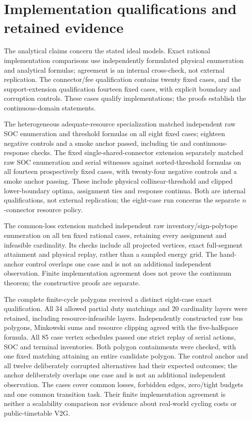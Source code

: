 \section{Implementation qualifications and retained evidence}
\label{app:evidence}
The analytical claims concern the stated ideal models. Exact rational
implementation comparisons use independently formulated physical enumeration
and analytical formulas; agreement is an internal cross-check, not external
replication. The connector/fee qualification contains twenty fixed cases,
and the support-extension qualification fourteen fixed cases, with explicit
boundary and corruption controls. These cases qualify implementations;
the proofs establish the continuous-domain statements.

The heterogeneous adequate-resource specialization matched independent raw
SOC enumeration and threshold formulas on all eight fixed cases; eighteen
negative controls and a smoke anchor passed, including tie and continuous-
response checks. The fixed single-shared-connector extension separately
matched raw SOC enumeration and serial witnesses against sorted-threshold
formulas on all fourteen prospectively fixed cases, with twenty-four negative
controls and a smoke anchor passing. These include physical collinear-threshold
and clipped lower-boundary optima, assignment ties and response continua.
Both are internal qualifications, not external replication; the eight-case
run concerns the separate $n$-connector resource policy.

The common-loss extension matched independent raw inventory/sign-polytope
enumeration on all ten fixed rational cases, retaining every assignment and
infeasible cardinality. Its checks include all projected vertices, exact
full-segment attainment and physical replay, rather than a sampled energy
grid. The hand-anchor control overlaps one case and is not an additional
independent observation. Finite implementation agreement does not prove the
continuum theorem; the constructive proofs are separate.

The complete finite-cycle polygons received a distinct eight-case exact
qualification. All 34 allowed partial duty matchings and 20 cardinality
layers were retained, including resource-infeasible layers. Independently
constructed raw bus polygons, Minkowski sums and resource clipping agreed
with the five-halfspace formula. All 85 case vertex schedules passed one
strict replay of serial actions, SOC and terminal inventories. Both polygon containments were
checked, with one fixed matching attaining an entire candidate polygon.
The control anchor and all twelve deliberately corrupted alternatives had
their expected outcomes; the anchor deliberately overlaps one case and is
not an additional independent observation. The cases cover common losses,
forbidden edges, zero/tight budgets and one common transition task. Their
finite implementation agreement is neither a scalability comparison nor
evidence about real-world cycling costs or public-timetable V2G.

